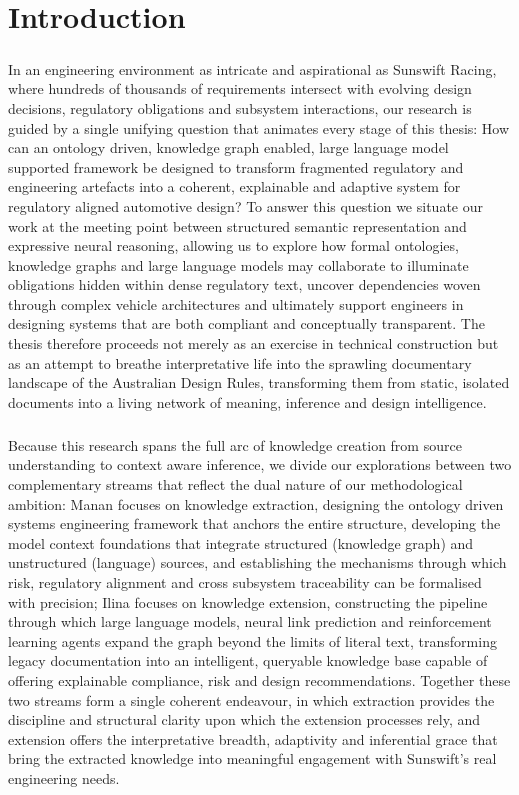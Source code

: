 \chapter{Introduction}

    \paragraph{}
    In an engineering environment as intricate and aspirational as Sunswift Racing, where hundreds of thousands of requirements intersect with evolving design decisions, regulatory obligations and subsystem interactions, our research is guided by a single unifying question that animates every stage of this thesis: How can an ontology driven, knowledge graph enabled, large language model supported framework be designed to transform fragmented regulatory and engineering artefacts into a coherent, explainable and adaptive system for regulatory aligned automotive design? To answer this question we situate our work at the meeting point between structured semantic representation and expressive neural reasoning, allowing us to explore how formal ontologies, knowledge graphs and large language models may collaborate to illuminate obligations hidden within dense regulatory text, uncover dependencies woven through complex vehicle architectures and ultimately support engineers in designing systems that are both compliant and conceptually transparent. The thesis therefore proceeds not merely as an exercise in technical construction but as an attempt to breathe interpretative life into the sprawling documentary landscape of the Australian Design Rules, transforming them from static, isolated documents into a living network of meaning, inference and design intelligence.

    \paragraph{}
    Because this research spans the full arc of knowledge creation from source understanding to context aware inference, we divide our explorations between two complementary streams that reflect the dual nature of our methodological ambition: Manan focuses on knowledge extraction, designing the ontology driven systems engineering framework that anchors the entire structure, developing the model context foundations that integrate structured (knowledge graph) and unstructured (language) sources, and establishing the mechanisms through which risk, regulatory alignment and cross subsystem traceability can be formalised with precision; Ilina focuses on knowledge extension, constructing the pipeline through which large language models, neural link prediction and reinforcement learning agents expand the graph beyond the limits of literal text, transforming legacy documentation into an intelligent, queryable knowledge base capable of offering explainable compliance, risk and design recommendations. Together these two streams form a single coherent endeavour, in which extraction provides the discipline and structural clarity upon which the extension processes rely, and extension offers the interpretative breadth, adaptivity and inferential grace that bring the extracted knowledge into meaningful engagement with Sunswift’s real engineering needs.